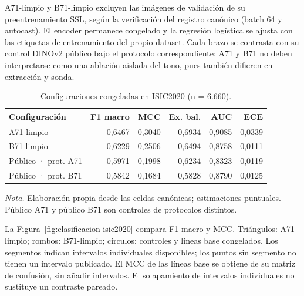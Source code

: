 A71-limpio y B71-limpio excluyen las imágenes de validación de su preentrenamiento SSL, según la verificación del registro canónico (batch 64 y autocast). El encoder permanece congelado y la regresión logística se ajusta con las etiquetas de entrenamiento del propio dataset. Cada brazo se contrasta con su control DINOv2 público bajo el protocolo correspondiente; A71 y B71 no deben interpretarse como una ablación aislada del tono, pues también difieren en extracción y sonda.

\begin{table}[!htbp]
\centering
\caption{Configuraciones congeladas en ISIC2020 (n = 6.660).}
\label{tab:clasificacion-isic2020}
\begingroup\fontsize{11}{13}\selectfont\singlespacing
\begin{tabularx}{\textwidth}{@{}Lrrrrr@{}}
\toprule
Configuración & F1 macro & MCC & Ex. bal. & AUC & ECE \\
\midrule
A71-limpio & 0,6467 & 0,3040 & 0,6934 & 0,9085 & 0,0339 \\
B71-limpio & 0,6229 & 0,2506 & 0,6494 & 0,8758 & 0,0111 \\
Público · prot. A71 & 0,5971 & 0,1998 & 0,6234 & 0,8323 & 0,0119 \\
Público · prot. B71 & 0,5842 & 0,1684 & 0,5828 & 0,8790 & 0,0125 \\
\bottomrule
\end{tabularx}
\par\smallskip\raggedright\textit{Nota.} Elaboración propia desde las celdas canónicas; estimaciones puntuales. Público A71 y público B71 son controles de protocolos distintos.\par\endgroup
\end{table}
La Figura~\ref{fig:clasificacion-isic2020} compara F1 macro y MCC. Triángulos: A71-limpio; rombos: B71-limpio; círculos: controles y líneas base congelados. Los segmentos indican intervalos individuales disponibles; los puntos sin segmento no tienen un intervalo publicado. El MCC de las líneas base se obtiene de su matriz de confusión, sin añadir intervalos. El solapamiento de intervalos individuales no sustituye un contraste pareado.

